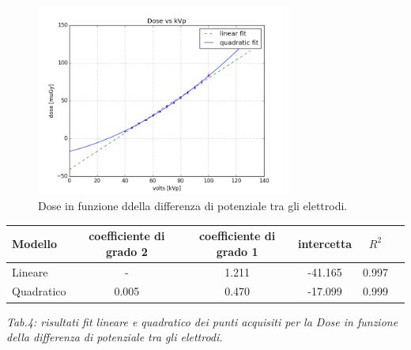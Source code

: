 \documentclass[a4paper]{article}
\begin{document}
\begin{figure}[H]
\centering
\includegraphics[width=0.75\textwidth]{dosevsvolts.png}
\caption{Dose in funzione ddella differenza di potenziale tra gli elettrodi.}
\end{figure}

\begin{center} 
		
		\begin{tabular}{lccccc}
			\hline
			\hline
			\textbf{Modello}	& \textbf{coefficiente di grado 2}& \textbf{coefficiente di grado 1}& \textbf{intercetta}&  \textbf{$R^{2}$} 	 \\
			\hline
			\hline
			Lineare	&-&1.211&-41.165&0.997	\\
			Quadratico	&0.005&0.470&-17.099&0.999\\
			
			
			\hline
			\hline
		\end{tabular}
		\linebreak
		\emph{Tab.4: risultati fit lineare e quadratico dei punti acquisiti per la Dose in funzione della differenza di potenziale tra gli elettrodi.} 
	\end{center} 
\end{document}
